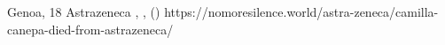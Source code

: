           {Genoa, }
          {18}
          {Astrazeneca}
          {}
          {
            ,
            ,
             ()
          }
          {https://nomoresilence.world/astra-zeneca/camilla-canepa-died-from-astrazeneca/}
